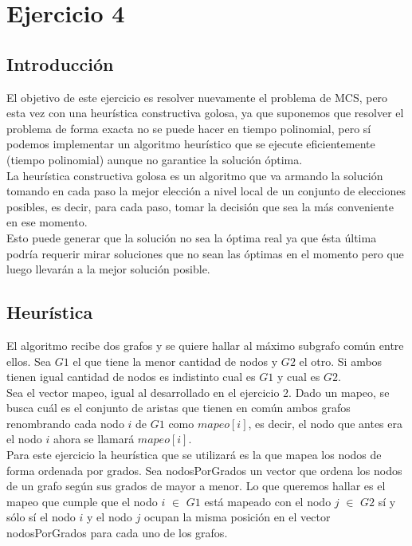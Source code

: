 \section{Ejercicio 4}

\subsection{Introducción}
\noindent El objetivo de este ejercicio es resolver nuevamente el problema de MCS, pero esta vez con una heurística constructiva golosa, ya que suponemos que resolver el problema de forma exacta no se puede hacer en tiempo polinomial, pero sí podemos implementar un algoritmo heurístico que se ejecute eficientemente (tiempo polinomial) aunque no garantice la solución óptima.\\
La heurística constructiva golosa es un algoritmo que va armando la solución tomando en cada paso la mejor elección a nivel local de un conjunto de elecciones posibles, es decir, para cada paso, tomar la decisión que sea la más conveniente en ese momento.\\
Esto puede generar que la solución no sea la óptima real ya que ésta última podría requerir mirar soluciones que no sean las óptimas en el momento pero que luego llevarán a la mejor solución posible. 

\subsection{Heurística}
\noindent El algoritmo recibe dos grafos y se quiere hallar al máximo subgrafo común entre ellos. Sea $G1$ el que tiene la menor cantidad de nodos y $G2$ el otro. Si ambos tienen igual cantidad de nodos es indistinto cual es $G1$ y cual es $G2$.\\
Sea el vector mapeo, igual al desarrollado en el ejercicio 2. Dado un mapeo, se busca cuál es el conjunto de aristas que tienen en común ambos grafos renombrando cada nodo $i$ de $G1$ como $mapeo[i]$, es decir, el nodo que antes era el nodo $i$ ahora se llamará $mapeo[i]$.\\
Para este ejercicio la heurística que se utilizará es la que mapea los nodos de forma ordenada por grados. Sea nodosPorGrados un vector que ordena los nodos de un grafo según sus grados de mayor a menor. Lo que queremos hallar es el mapeo que cumple que el nodo $i$ $\in$ $G1$ está mapeado con el nodo $j$ $\in$ $G2$ sí y sólo sí el nodo $i$ y el nodo $j$ ocupan la misma posición en el vector nodosPorGrados para cada uno de los grafos.\\

